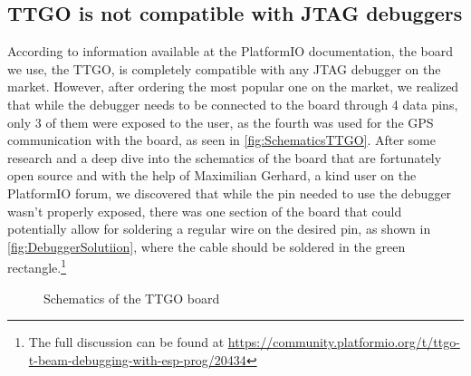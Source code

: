 \subsection{TTGO is not compatible with JTAG debuggers}
According to information available at the PlatformIO documentation, the board we use, the TTGO, is completely compatible with any JTAG debugger on the market. However, after ordering the most popular one on the market, we realized that while the debugger needs to be connected to the board through 4 data pins, only 3 of them were exposed to the user, as the fourth was used for the GPS communication with the board, as seen in \autoref{fig:SchematicsTTGO}. After some research and a deep dive into the schematics of the board that are fortunately open source and with the help of Maximilian Gerhard, a kind user on the PlatformIO forum, we discovered that while the pin needed to use the debugger wasn't properly exposed, there was one section of the board that could potentially allow for soldering a regular wire on the desired pin, as shown in \autoref{fig:DebuggerSolutiion}, where the cable should be soldered in the green rectangle.\footnote{The full discussion can be found at \url{https://community.platformio.org/t/ttgo-t-beam-debugging-with-esp-prog/20434}}
\begin{figure}[h!]
    \centering
    \advance\leftskip-4cm
    \advance\rightskip-4cm
    \qquad
    \caption[Schematics of the TTGO board]{Schematics of the TTGO board \cite{TTGOSchematics}}%
    \label{fig:SchematicsTTGO}%
\end{figure}

